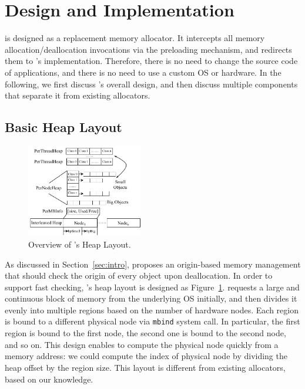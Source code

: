 \section{Design and Implementation}
\label{sec:implement}

\NM{} is designed as a replacement memory allocator. It intercepts all memory allocation/deallocation invocations via the preloading mechanism, and redirects them to \NM{}'s implementation. Therefore, there is no need to change the source code of applications, and there is no need to use a custom OS or hardware. In the following, we first discuss \NM{}'s overall design, and then discuss multiple components that separate it from existing allocators.

\subsection{Basic Heap Layout}
\label{sec:overview}

\begin{figure}[!ht]
\begin{center}
\includegraphics[width=0.45\textwidth]{figure/heaplayout1}
\end{center}
\caption{Overview of \NA{}'s Heap Layout.
\label{fig:overview}}
\end{figure}

As discussed in Section~\ref{sec:intro}, \NM{} proposes an origin-based memory management that should check the origin of every object upon deallocation. In order to support fast checking, \NM{}'s heap layout is designed as  Figure~\ref{fig:overview}. \NM{} requests a large and continuous block of memory from the underlying OS initially, and then divides it evenly into multiple regions based on the number of hardware nodes. Each region is bound to a different physical node via \texttt{mbind} system call. In particular, the first region is bound to the first node, the second one is bound to the second node, and so on. This design enables to compute the physical node quickly from a memory address: we could compute the index of physical node by dividing the heap offset by the region size. This layout is different from existing allocators, based on our knowledge. 

